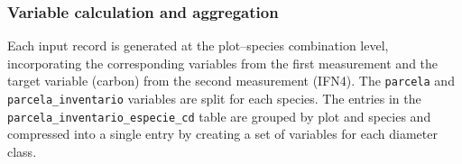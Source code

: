 \subsubsection{Variable calculation and aggregation}

Each input record is generated at the plot--species combination level, incorporating the corresponding variables from the first measurement and the target variable (carbon) from the second measurement (IFN4). The \texttt{parcela} and \texttt{parcela\_inventario} variables are split for each species. The entries in the \texttt{parcela\_inventario\_especie\_cd} table are grouped by plot and species and compressed into a single entry by creating a set of variables for each diameter class.



